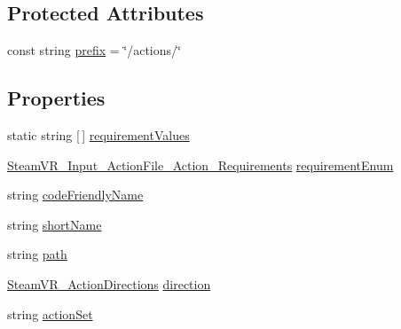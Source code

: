 \subsection*{Protected Attributes}
\begin{DoxyCompactItemize}
\item 
const string \mbox{\hyperlink{class_valve_1_1_v_r_1_1_steam_v_r___input___action_file___action_ad9bd5a234840ab24b68fde7d5f7ef192}{prefix}} = \char`\"{}/actions/\char`\"{}
\end{DoxyCompactItemize}
\subsection*{Properties}
\begin{DoxyCompactItemize}
\item 
static string \mbox{[}$\,$\mbox{]} \mbox{\hyperlink{class_valve_1_1_v_r_1_1_steam_v_r___input___action_file___action_a2d51f4912e2ebd1eedae1f83f5302464}{requirement\+Values}}
\item 
\mbox{\hyperlink{namespace_valve_1_1_v_r_aad5d315b08bb9488c260d7228a1337e6}{Steam\+V\+R\+\_\+\+Input\+\_\+\+Action\+File\+\_\+\+Action\+\_\+\+Requirements}} \mbox{\hyperlink{class_valve_1_1_v_r_1_1_steam_v_r___input___action_file___action_ae86af8359cda6e60db6f8540f8cdc7bb}{requirement\+Enum}}
\item 
string \mbox{\hyperlink{class_valve_1_1_v_r_1_1_steam_v_r___input___action_file___action_afbfbed82a67758edcf8bf090efd1b5e3}{code\+Friendly\+Name}}
\item 
string \mbox{\hyperlink{class_valve_1_1_v_r_1_1_steam_v_r___input___action_file___action_a534980e11d4d8becde183dbd1fecd107}{short\+Name}}
\item 
string \mbox{\hyperlink{class_valve_1_1_v_r_1_1_steam_v_r___input___action_file___action_a9a3f65795b6df5da93d4b78820b23d89}{path}}
\item 
\mbox{\hyperlink{namespace_valve_1_1_v_r_a1e6192cb5ddaf204afab87ccb5728780}{Steam\+V\+R\+\_\+\+Action\+Directions}} \mbox{\hyperlink{class_valve_1_1_v_r_1_1_steam_v_r___input___action_file___action_ab4c2ef5c63a34662ee0d9c8f416ac8a8}{direction}}
\item 
string \mbox{\hyperlink{class_valve_1_1_v_r_1_1_steam_v_r___input___action_file___action_acd0651efa73a237482ac312f9ea5c6cb}{action\+Set}}
\end{DoxyCompactItemize}


